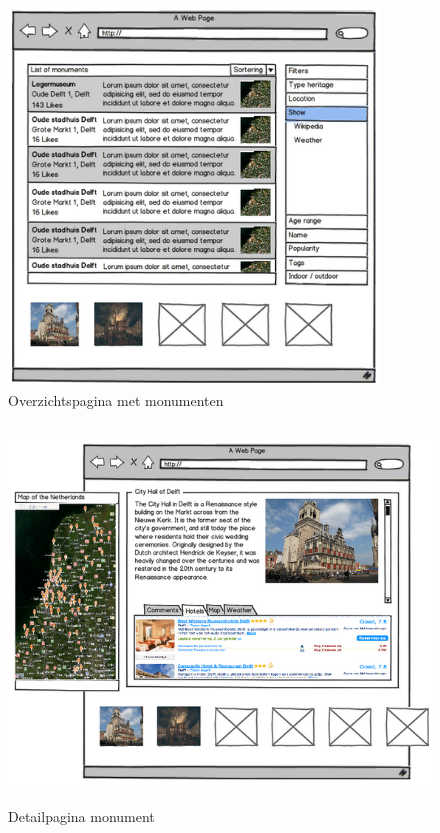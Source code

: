 \documentclass[a4paper,10pt]{article}
\begin{document}
			\begin{figure}[ht!]
				\centering
				\includegraphics[height=10cm]{interface2.png}
				\caption{Overzichtspagina met monumenten \label{interface2}}
			\end{figure}
			\begin{figure}[ht!]
				\centering
				\includegraphics[height=10cm]{interface3.png}
				\caption{Detailpagina monument \label{interface3}}
			\end{figure}
	
	\clearpage

	\printglossary
\end{document}
